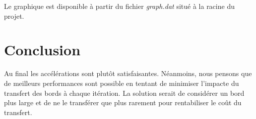 \documentclass[a4paper,oneside,12pt]{article}
\begin{document}
Le graphique est disponible à partir du fichier \textit{graph.dat} situé à la racine du projet.

\section*{Conclusion}

Au final les accélérations sont plutôt satisfaisantes. Néanmoins, nous pensons que de meilleurs performances sont
possible en tentant de minimiser l'impacte du transfert des bords à chaque itération. La solution serait de considérer
un bord plus large et de ne le transférer que plus rarement pour rentabiliser le coût du transfert.
\end{document}
